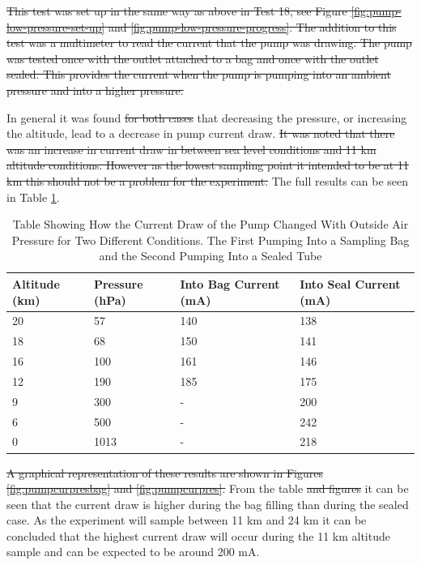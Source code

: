 \documentclass[a4paper,12pt,twoside]{article}
\providecommand{\DIFaddtex}[1]{{\protect\color{blue}\uwave{#1}}} %
\providecommand{\DIFdeltex}[1]{{\protect\color{red}\sout{#1}}}                      %
\providecommand{\DIFdelbegin}{} %
\providecommand{\DIFdelend}{} %
\providecommand{\DIFaddFL}[1]{\DIFadd{#1}} %
\providecommand{\DIFaddbeginFL}{} %
\providecommand{\DIFaddendFL}{} %
\providecommand{\DIFadd}[1]{\texorpdfstring{\DIFaddtex{#1}}{#1}} %
\providecommand{\DIFdel}[1]{\texorpdfstring{\DIFdeltex{#1}}{}} %
\newcommand{\DIFscaledelfig}{0.5}
\newlength{\DIFdelgraphicswidth} %
\newlength{\DIFdelgraphicsheight} %
\newcommand{\DIFaddincludegraphics}[2][]{{\color{blue}\fbox{\DIFOincludegraphics[#1]{#2}}}} %
\newcommand{\DIFdelincludegraphics}[2][]{%
\sbox{\DIFdelgraphicsbox}{\DIFOincludegraphics[#1]{#2}}%
\settoboxwidth{\DIFdelgraphicswidth}{\DIFdelgraphicsbox} %
\settoboxtotalheight{\DIFdelgraphicsheight}{\DIFdelgraphicsbox} %
\scalebox{\DIFscaledelfig}{%
\parbox[b]{\DIFdelgraphicswidth}{\usebox{\DIFdelgraphicsbox}\\[-\baselineskip] \rule{\DIFdelgraphicswidth}{0em}}\llap{\resizebox{\DIFdelgraphicswidth}{\DIFdelgraphicsheight}{%
\setlength{\unitlength}{\DIFdelgraphicswidth}%
\begin{picture}(1,1)%
\thicklines\linethickness{2pt} %
{\color[rgb]{1,0,0}\put(0,0){\framebox(1,1){}}}%
{\color[rgb]{1,0,0}\put(0,0){\line( 1,1){1}}}%
{\color[rgb]{1,0,0}\put(0,1){\line(1,-1){1}}}%
\end{picture}%
}\hspace*{3pt}}} %
} %
\DeclareRobustCommand{\DIFdelbegin}{\DIFOdelbegin \let\includegraphics\DIFdelincludegraphics} %
\DeclareRobustCommand{\DIFdelend}{\DIFOaddend \let\includegraphics\DIFOincludegraphics} %
\DeclareRobustCommand{\DIFaddbeginFL}{\DIFOaddbeginFL \let\includegraphics\DIFaddincludegraphics} %
\DeclareRobustCommand{\DIFaddendFL}{\DIFOaddendFL \let\includegraphics\DIFOincludegraphics} %
\begin{document}
\DIFdelbegin \DIFdel{This test was set up in the same way as above in Test 18, see Figure \ref{fig:pump-low-pressure-set-up} and \ref{fig:pump-low-pressure-progress}. The addition to this test was a multimeter to read the current that the pump was drawing. The pump was tested once with the outlet attached to a bag and once with the outlet sealed. This provides the current when the pump is pumping into an ambient pressure and into a higher pressure.
}%

\DIFdelend In general it was found \DIFdelbegin \DIFdel{for both cases }\DIFdelend that decreasing the pressure, or increasing the altitude, lead to a decrease in pump current draw. \DIFdelbegin \DIFdel{It was noted that there was an increase in current draw in between sea level conditions and 11 km altitude conditions. However as the lowest sampling point it intended to be at 11 km this should not be a problem for the experiment. }\DIFdelend The full results can be seen in Table \ref{tab:pumpcurrentpressure}. 

\begin{table}[H]
\centering

\begin{tabular}{|l|l|l|l|}
\hline
\textbf{Altitude (km)} & \textbf{Pressure (hPa)} & \textbf{Into Bag Current (mA)} & \textbf{Into Seal Current (mA)} \\ \hline
20 & 57 & 140 & 138 \\ \hline
18 & 68 & 150 & 141 \\ \hline
16 & 100 & 161 & 146 \\ \hline
12 & 190 & 185 & 175 \\ \hline
9 & 300 & - & 200 \\ \hline
6 & 500 & - & 242 \\ \hline
0 & 1013 & - & 218 \\ \hline
\end{tabular}
\caption{Table Showing How the Current Draw of the Pump Changed With Outside Air Pressure for Two Different Conditions. The First Pumping Into a Sampling Bag and the Second Pumping Into a Sealed Tube\DIFaddbeginFL \DIFaddFL{.}\DIFaddendFL }
\label{tab:pumpcurrentpressure}
\end{table}

\DIFdelbegin \DIFdel{A graphical representation of these results are shown in Figures \ref{fig:pumpcurpresbag} and \ref{fig:pumpcurpres}. }\DIFdelend From the table \DIFdelbegin \DIFdel{and figures }\DIFdelend it can be seen that the current draw is higher during the bag filling than during the sealed case. As the experiment will sample between 11 km and 24 km it can be concluded that the highest current draw will occur during the 11 km altitude sample and can be expected to be around 200 mA. 
\end{document}
